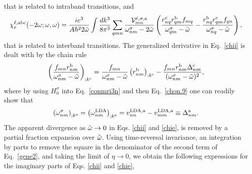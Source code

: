 \documentclass[floatfix,prb,aps,superscriptaddress,11pt,preprint,letterpaper]{revtex4}
\begin{document}
that  is related to intraband transitions, and 
\begin{equation}\label{chie}
\chi^{\ell,\mathrm{a}\mathrm{b}\mathrm{c}}_e (-2\omega;\omega,\omega)
=\frac{ie^3}{A\hbar^22\tilde\omega}
\int \frac{dk^3}{8\pi^3}
\sum_{qmn}
\frac{{\mathbf{\cal V}}_{mn}^{\ell,\sigma,\mathrm{a}}}{\omega^\sigma_{nm}-2\tilde\omega}
\left(
\frac{r_{nq}^{\mathrm{c}} r_{qm}^{\mathrm{b}} 
f_{mq}}{\omega^\sigma_{qm}-\tilde\omega}
-\frac{r_{nq}^{\mathrm{b}} r_{qm}^{\mathrm{c}} 
f_{qn}}{\omega^\sigma_{nq}-\tilde\omega}
\right),
\end{equation} 
that is related to interband transitions.
The generalized derivative in Eq.~\eqref{chii} is dealt with by the chain rule 
\begin{equation}\label{gene2}
\left(\frac{f_{mn}r_{nm}^{\mathrm{b}}}{\omega^\sigma_{nm}-\tilde\omega}\right)_{;k^{\mathrm{c}}}=
\frac{f_{mn}}{\omega^\sigma_{nm}-\tilde\omega}\left(r_{nm}^{\mathrm{b}}\right)_{;k^{\mathrm{c}}}
-\frac{f_{mn}r_{nm}^{\mathrm{b}}\Delta_{nm}^{\mathrm{c}}}{(\omega^\sigma_{nm}-\tilde\omega)^2}
,
\end{equation}
where by using $H^\sigma_0$ into Eq.~\eqref{conmri3n} and then
Eq.~\eqref{chon.9}
 one can readily
show that
\begin{align}\label{eli.13}
\left(\omega^\sigma_{nm}\right)_{;k^{\mathrm{a}}}
=
\left(\omega^{\mathrm{LDA}}_{nm}\right)_{;k^{\mathrm{a}}}
= 
v_{nn}^{\mathrm{LDA},\mathrm{a}}-v_{mm}^{\mathrm{LDA},\mathrm{a}}\equiv\Delta_{nm}^{\mathrm{a}}
.
\end{align} 
The apparent divergence as $\tilde\omega\to 0$
in Eqs. \eqref{chii} and \eqref{chie},  
is removed  by
 a partial fraction expansion over $\tilde\omega$. 
Using time-reversal invariance, an integration by parts to 
remove the square in the denominator of the second term of Eq.~\eqref{gene2}, 
and taking the limit of $\eta\to 0$, 
we obtain the following expressions for the imaginary parts of 
Eqs. \eqref{chii} and \eqref{chie}, 
\end{document}
